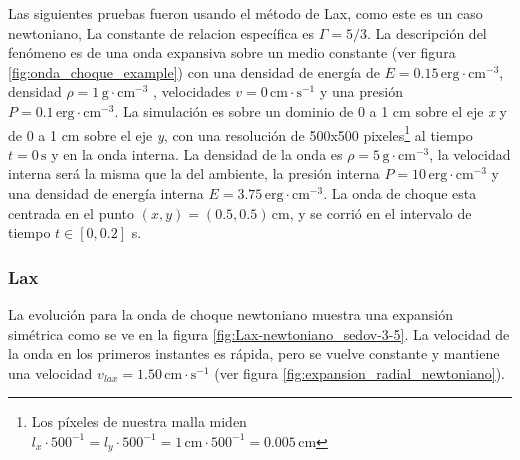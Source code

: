 \documentclass[12pt,a4paper]{book}
\begin{document}


Las siguientes pruebas fueron usando el método de Lax, como este es un caso newtoniano, La constante de relacion específica es $\Gamma = 5/3$. La descripción del fenómeno es de una onda expansiva sobre un medio constante (ver figura \ref{fig:onda_choque_example}) con una densidad de energía de $E = 0.15 \, \mathrm{erg} \cdot \mathrm{cm}^{-3}$, densidad $\rho = 1 \, \mathrm{g} \cdot \mathrm{cm}^{-3}$ , velocidades $v = 0 \, \mathrm{cm} \cdot \mathrm{s}^{-1}$ y una presión $P=0.1 \, \mathrm{erg} \cdot \mathrm{cm}^{-3} $. La simulación es sobre un dominio de 0 a 1 cm sobre el eje \emph{x} y de 0 a 1 cm sobre el eje \emph{y}, con una resolución de 500x500 pixeles\footnote{Los píxeles de nuestra malla miden $l_x\cdot 500^{-1} = l_y\cdot 500^{-1}  = 1 \, \mathrm{cm} \cdot 500^{-1} = 0.005 \, \mathrm{cm}$} al tiempo $t=0 \, \mathrm{s}$  y en la onda interna. La densidad de la onda es $\rho=5 \, \mathrm{g} \cdot \mathrm{cm}^{-3}$, la velocidad interna será la misma que la del ambiente, la presión interna $P=10 \, \mathrm{erg} \cdot \mathrm{cm}^{-3} $ y una densidad de energía interna $E = 3.75 \, \mathrm{erg} \cdot \mathrm{cm}^{-3}$. La onda de choque esta centrada en el punto $(x,y) = (0.5, 0.5) \, \mathrm{cm}$, y se corrió en el intervalo de tiempo $t \in \left[ 0 , 0.2 \right]$ s.
\subsubsection{Lax}
La evolución para la onda de choque newtoniano muestra una expansión simétrica como se ve en la figura \ref{fig:Lax-newtoniano_sedov-3-5}. La velocidad de la onda en los primeros instantes es rápida, pero se vuelve constante y mantiene una velocidad $v_{lax} = 1.50 \, \mathrm{cm} \cdot \mathrm{s}^{-1}$ (ver figura \ref{fig:expansion_radial_newtoniano}).
\end{document}
